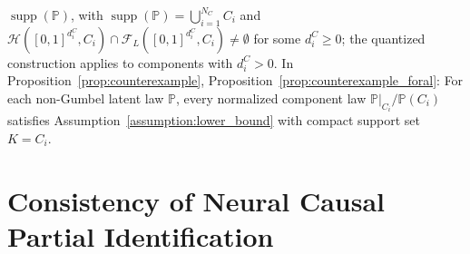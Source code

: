 \documentclass[12pt]{article}
\theoremstyle{plain}
\theoremstyle{definition}
\theoremstyle{remark}
\begin{document}
$\operatorname{supp}(\mathbb{P})$, with $\operatorname{supp}(\mathbb{P})=\bigcup_{i=1}^{N_C}C_i$ and $\mathcal{H}([0,1]^{d_i^C},C_i)\cap\mathcal{F}_L([0,1]^{d_i^C},C_i)\neq\emptyset$ for some $d_i^C\geqslant0$; the quantized construction applies to components with $d_i^C>0$. In Proposition~\ref{prop:counterexample}, Proposition~\ref{prop:counterexample_foral}: For each non-Gumbel latent law $\mathbb P$, every normalized component law $\mathbb P|_{C_i}/\mathbb P(C_i)$ satisfies Assumption~\ref{assumption:lower_bound} with compact support set $K=C_i$.

\section{Consistency of Neural Causal Partial Identification}\label{sec:consistency}
\end{document}
